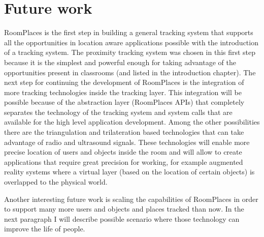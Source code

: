 \section{Future work}

RoomPlaces is the first step in building a general tracking system that supports all the opportunities in location aware applications possible with the introduction of a tracking system. The proximity tracking system was chosen in this first step because it is the simplest and powerful enough for taking advantage of the opportunities present in classrooms (and listed in the introduction chapter). The next step for continuing the development of RoomPlaces is the integration of more tracking technologies inside the tracking layer. This integration will be possible because of the abstraction layer (RoomPlaces APIs) that completely separates the technology of the tracking system and system calls that are available for the high level application development. Among the other possibilities there are the triangulation and trilateration based technologies that can take advantage of radio and ultrasound signals. These technologies will enable more precise location of users and objects inside the room and will allow to create applications that require great precision for working, for example augmented reality systems where a virtual layer (based on the location of certain objects) is overlapped to the physical world.

Another interesting future work is scaling the capabilities of RoomPlaces in order to support many more users and objects and places tracked than now. In the next paragraph I will describe possible scenario where those technology can improve the life of people.

